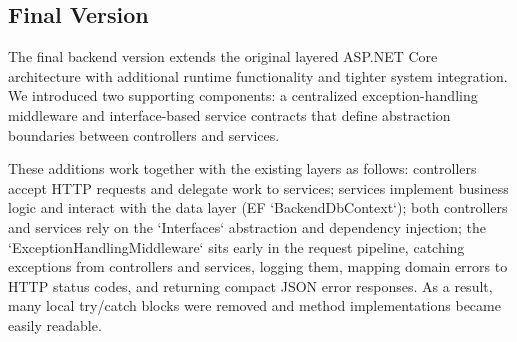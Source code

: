 \subsection{Final Version}
\hspace*{1cm}The final backend version extends the original layered ASP.NET Core architecture with additional runtime functionality and tighter system integration. We introduced two supporting components: a centralized exception-handling middleware and interface-based service contracts that define abstraction boundaries between controllers and services.

\hspace*{1cm}These additions work together with the existing layers as follows: controllers accept HTTP requests and delegate work to services; services implement business logic and interact with the data layer (EF `BackendDbContext`); both controllers and services rely on the `Interfaces` abstraction and dependency injection; the `ExceptionHandlingMiddleware` sits early in the request pipeline, catching exceptions from controllers and services, logging them, mapping domain errors to HTTP status codes, and returning compact JSON error responses. As a result, many local try/catch blocks were removed and method implementations became easily readable.

